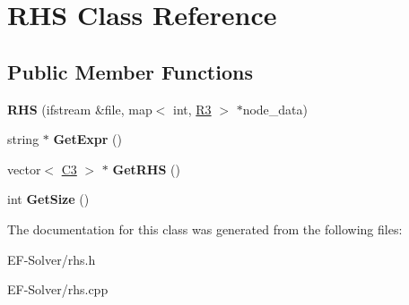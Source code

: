 \hypertarget{class_r_h_s}{}\section{R\+HS Class Reference}
\label{class_r_h_s}
\subsection*{Public Member Functions}
\begin{DoxyCompactItemize}
\item 
{\bfseries R\+HS} (ifstream \&file, map$<$ int, \hyperlink{class_r3}{R3} $>$ $\ast$node\+\_\+data)\hypertarget{class_r_h_s_a6ba0686af026bf64e4d5eedd0bc369ed}{}\label{class_r_h_s_a6ba0686af026bf64e4d5eedd0bc369ed}

\item 
string $\ast$ {\bfseries Get\+Expr} ()\hypertarget{class_r_h_s_afef333d9b6c0d45b467e4056697c8e7d}{}\label{class_r_h_s_afef333d9b6c0d45b467e4056697c8e7d}

\item 
vector$<$ \hyperlink{class_c3}{C3} $>$ $\ast$ {\bfseries Get\+R\+HS} ()\hypertarget{class_r_h_s_ab31764877ce436e254dad7d5288e1942}{}\label{class_r_h_s_ab31764877ce436e254dad7d5288e1942}

\item 
int {\bfseries Get\+Size} ()\hypertarget{class_r_h_s_a77b9a6902dd139acb20c5f5f8f05cd58}{}\label{class_r_h_s_a77b9a6902dd139acb20c5f5f8f05cd58}

\end{DoxyCompactItemize}


The documentation for this class was generated from the following files\+:\begin{DoxyCompactItemize}
\item 
E\+F-\/\+Solver/rhs.\+h\item 
E\+F-\/\+Solver/rhs.\+cpp\end{DoxyCompactItemize}
